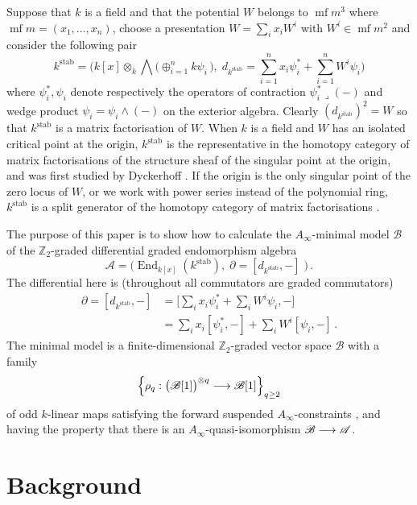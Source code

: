 \documentclass[english,letter paper,12pt,leqno]{article}
\theoremstyle{example}
\numberwithin{equation}{section}
\def\stab{\operatorname{stab}}
\def\be{\begin{equation}}
\def\ee{\end{equation}}
\def\nZ{\mathds{Z}}
\DeclareMathOperator{\End}{End}
\DeclareMathOperator{\mf}{mf}
\begin{document}
Suppose that $k$ is a field and that the potential $W$ belongs to $\mf{m}^3$ where $\mf{m} = (x_1,\ldots,x_n)$, choose a presentation $W = \sum_i x_i W^i$ with $W^i \in \mf{m}^2$ and consider the following pair
\begin{equation}\label{eq:kstab}
k^{\operatorname{stab}} = \Big( k[x] \otimes_k \bigwedge\big( \oplus_{i=1}^n k\psi_i \,\big), \;d_{k^{\stab}} = \sum_{i=1}^n x_i \psi_i^* + \sum_{i=1}^n W^i \psi_i \Big)
\end{equation}
where $\psi_i^*, \psi_i$ denote respectively the operators of contraction $\psi_i^* \lrcorner (-)$ and wedge product $\psi_i = \psi_i \wedge (-)$ on the exterior algebra. Clearly $(d_{k^{\stab}})^2 = W$ so that $k^{\stab}$ is a matrix factorisation of $W$. When $k$ is a field and $W$ has an isolated critical point at the origin, $k^{\stab}$ is the representative in the homotopy category of matrix factorisations of the structure sheaf of the singular point at the origin, and was first studied by Dyckerhoff \cite{d0904.4713}. If the origin is the only singular point of the zero locus of $W$, or we work with power series instead of the polynomial ring, $k^{\stab}$ is a split generator of the homotopy category of matrix factorisations \cite[Theorem ?]{?}.

The purpose of this paper is to show how to calculate the $A_\infty$-minimal model $\mathscr{B}$ of the $\nZ_2$-graded differential graded endomorphism algebra
\be\label{eq:defnaw}
\mathscr{A} = \Big( \End_{k[x]}(k^{\operatorname{stab}}), \; \partial = [d_{k^{\stab}},-] \; \Big)\,.
\ee 
The differential here is (throughout all commutators are graded commutators)
\begin{align*}
\partial = [d_{k^{\stab}},-] &= \Big[\sum_i x_i \psi_i^* + \sum_i W^i \psi_i, -\Big]\\
&= \sum_i x_i [\psi_i^*,-] + \sum_i W^i [\psi_i,-]\,.
\end{align*}
The minimal model is a finite-dimensional $\nZ_2$-graded vector space $\mathscr{B}$ with a family 
\[
\left\{ \rho_q: \big(\mathscr{B}[1]\big)^{\otimes q} \longrightarrow \mathscr{B}[1] \right\}_{q \ge 2}
\]
of odd $k$-linear maps satisfying the forward suspended $A_\infty$-constraints \cite{lazaroiu}, and having the property that there is an $A_\infty$-quasi-isomorphism $\mathscr{B} \longrightarrow \mathscr{A}$.

\section{Background}
\end{document}
